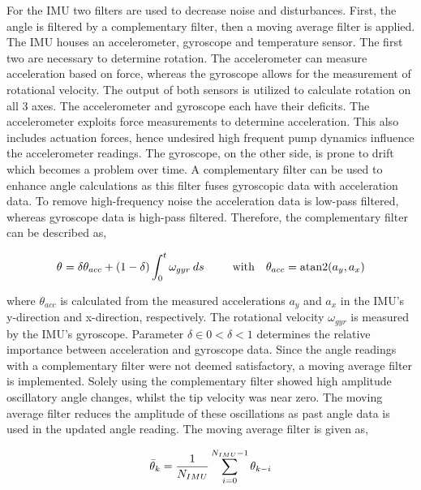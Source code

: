 For the IMU two filters are used to decrease noise and disturbances. First, the angle is filtered by a complementary filter, then a moving average filter is applied. The IMU houses an accelerometer, gyroscope and temperature sensor. The first two are necessary to determine rotation. The accelerometer can measure acceleration based on force, whereas the gyroscope allows for the measurement of rotational velocity. The output of both sensors is utilized to calculate rotation on all 3 axes. The accelerometer and gyroscope each have their deficits. The accelerometer exploits force measurements to determine acceleration. This also includes actuation forces, hence undesired high frequent pump dynamics influence the accelerometer readings. The gyroscope, on the other side, is prone to drift which becomes a problem over time. A complementary filter can be used to enhance angle calculations as this filter fuses gyroscopic data with acceleration data. To remove high-frequency noise the acceleration data is low-pass filtered, whereas gyroscope data is high-pass filtered. Therefore, the complementary filter can be described as, 

\begin{equation}
    \theta_{} = \delta \theta_{acc} + (1-\delta) \int_0^t \omega_{gyr} \hspace{2pt} ds    \hspace{25pt} \text{with}  \hspace{10pt} \theta_{acc} = \operatorname{atan2}(a_y,a_x)
\end{equation}

where $\theta_{acc}$ is calculated from the measured accelerations $a_y$ and $a_x$ in the IMU's y-direction and x-direction, respectively. The rotational velocity $\omega_{gyr}$ is measured by the IMU's gyroscope. Parameter $\delta \in 0 < \delta < 1$ determines the relative importance between acceleration and gyroscope data. Since the angle readings with a complementary filter were not deemed satisfactory, a moving average filter is implemented. Solely using the complementary filter showed high amplitude oscillatory angle changes, whilst the tip velocity was near zero. The moving average filter reduces the amplitude of these oscillations as past angle data is used in the updated angle reading. The moving average filter is given as,

\begin{equation}
    \Bar{\theta}_k = \frac{1}{N_{IMU}}\sum_{i = 0} ^ {N_{IMU}-1} \theta_{k-i}
\end{equation}


